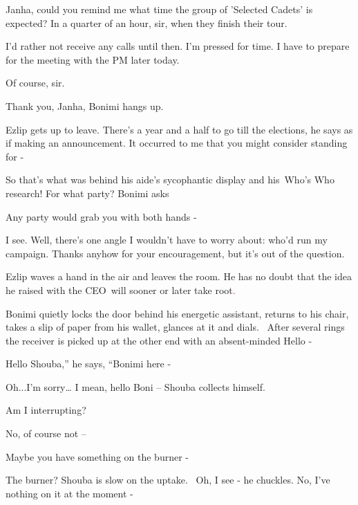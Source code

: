 \documentclass[letterpaper]{article}
\begin{document}
{\textquotedbl}Janha, could you remind me what time the group of 'Selected Cadets'\textcolor{red}{ }is
expected?{\textquotedbl} {\textquotedbl}In a quarter of an hour, sir, when they finish their tour.{\textquotedbl} 

{\textquotedbl}I'd rather not receive any calls until then. I'm pressed for time. I have to prepare for the meeting with
the PM later today.{\textquotedbl} 

{\textquotedbl}Of course, sir.{\textquotedbl} 

{\textquotedbl}Thank you, Janha,{\textquotedbl} Bonimi hangs up. 

Ezlip gets up to leave. {\textquotedbl}There's a year and a half to go till the elections,{\textquotedbl} he says as if
making an announcement. {\textquotedbl}It occurred to me that you might consider standing for -{\textquotedbl}

So that's what was behind his aide's sycophantic display\textcolor{red}{ }and his~{\textquotedbl}Who's
Who{\textquotedbl} research! {\textquotedbl}For what party?{\textquotedbl} Bonimi asks

{\textquotedbl}Any party would grab you with both hands - {\textquotedbl} 

{\textquotedbl}I see. Well, there's one angle\textcolor{red}{ }I wouldn't have to worry about: who'd run my campaign.
Thanks anyhow for your encouragement, but it's out of the question.{\textquotedbl}

Ezlip waves a hand in the air and leaves the room. He has no doubt that the idea he raised with the CEO~will sooner or
later take root\textcolor{red}{. }

Bonimi quietly locks the door behind his energetic assistant, returns to his chair, takes a slip of paper from his
wallet, glances at it and dials.~ After several rings the receiver is picked up at the other end with an absent-minded
{\textquotedbl}Hello -{\textquotedbl}

{\textquotedbl}Hello Shouba,'' he says, ``Bonimi here -{\textquotedbl} 

{\textquotedbl}Oh...I'm sorry{\dots} I mean, hello Boni --{\textquotedbl} Shouba collects himself.

{\textquotedbl}Am I interrupting?{\textquotedbl} 

{\textquotedbl}No, of course not --{\textquotedbl} 

{\textquotedbl}Maybe you have something on the burner -{\textquotedbl} 

{\textquotedbl}The burner?{\textquotedbl} Shouba is slow on the uptake. ~{\textquotedbl}Oh, I see -{\textquotedbl} he
chuckles. {\textquotedbl}No, I've nothing on it at the moment -{\textquotedbl} 
\end{document}
